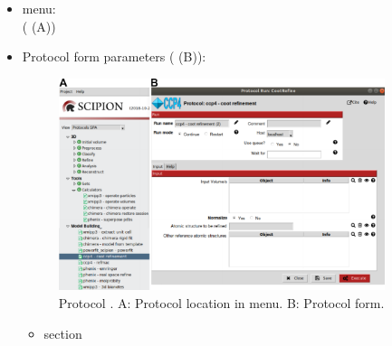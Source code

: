 \begin{itemize}
  \item \scipion menu:\\
    ( (A))\\
  
  \item Protocol form parameters ( (B)):\\
  
    \begin{figure}[H]
     \centering 
     \captionsetup{width=.7\linewidth} 
     \includegraphics[width=0.90\textwidth]{Images_appendix/Fig119.pdf}
     \caption{Protocol . A: Protocol location in \scipion menu. B: Protocol form.}
     \label{fig:app_protocol_coot_1}
    \end{figure}
    
    \begin{itemize}
     \item {} section\\


\end{itemize}
\end{itemize}
